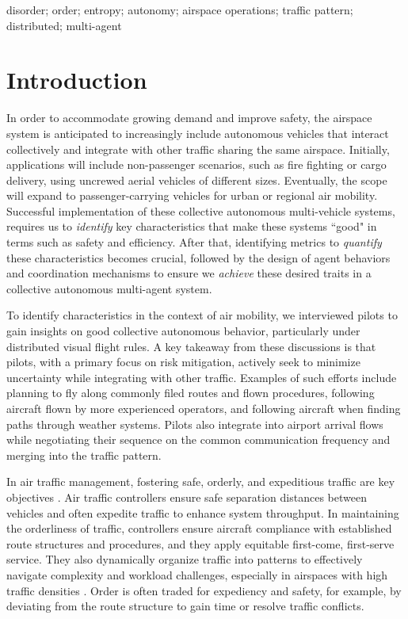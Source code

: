 \documentclass[conference, letter]{IEEEtran}
\begin{document}
\vspace{0.3cm}

\begin{IEEEkeywords} disorder; order; entropy; autonomy; airspace operations; traffic pattern; distributed; multi-agent
\end{IEEEkeywords}

\section{Introduction}

In order to accommodate growing demand and improve safety, the airspace system is anticipated to increasingly include autonomous vehicles that interact collectively and integrate with other traffic sharing the same airspace. Initially, applications will include non-passenger scenarios, such as fire fighting or cargo delivery, using uncrewed aerial vehicles of different sizes. Eventually, the scope will expand to passenger-carrying vehicles for urban or regional air mobility. Successful implementation of these collective autonomous multi-vehicle systems, requires us to \textit{identify} key characteristics that make these systems ``good" in terms such as safety and efficiency. After that, identifying metrics to \textit{quantify} these characteristics becomes crucial, followed by the design of agent behaviors and coordination mechanisms to ensure we \textit{achieve} these desired traits in a collective autonomous multi-agent system.

To identify characteristics in the context of air mobility, we interviewed pilots to gain insights on good collective autonomous behavior, particularly under distributed visual flight rules. A key takeaway from these discussions is that pilots, with a primary focus on risk mitigation, actively seek to minimize uncertainty while integrating with other traffic. Examples of such efforts include planning to fly along commonly filed routes and flown procedures, following aircraft flown by more experienced operators, and following aircraft when finding paths through weather systems. Pilots also integrate into airport arrival flows while negotiating their sequence on the common communication frequency and merging into the traffic pattern. 

In air traffic management, fostering safe, orderly, and expeditious traffic are key objectives \cite{b1}. Air traffic controllers ensure safe separation distances between vehicles and often expedite traffic to enhance system throughput. In maintaining the orderliness of traffic, controllers ensure aircraft compliance with established route structures and procedures, and they apply equitable first-come, first-serve service. They also dynamically organize traffic into patterns to effectively navigate complexity and workload challenges, especially in airspaces with high traffic densities \cite{b18}\cite{b17}. Order is often traded for expediency and safety, for example, by deviating from the route structure to gain time or resolve traffic conflicts.
\end{document}
